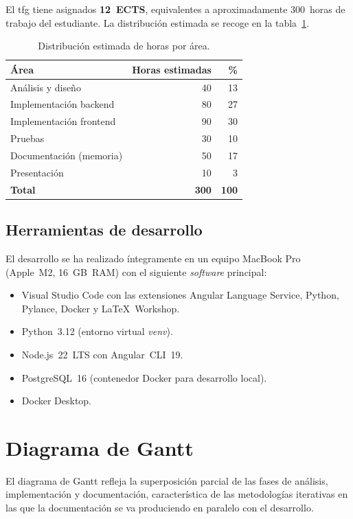El \gls{tfg} tiene asignados \textbf{12~ECTS}, equivalentes a aproximadamente 300~horas de
trabajo del estudiante. La distribución estimada se recoge en la
tabla~\ref{tab:horas}.

\begin{table}[H]
  \centering
  \caption{Distribución estimada de horas por área.}
  \label{tab:horas}
  \begin{tabular}{lrr}
    \toprule
    \textbf{Área} & \textbf{Horas estimadas} & \textbf{\%} \\
    \midrule
    Análisis y diseño & 40 & 13 \\
    Implementación backend & 80 & 27 \\
    Implementación frontend & 90 & 30 \\
    Pruebas & 30 & 10 \\
    Documentación (memoria) & 50 & 17 \\
    Presentación & 10 & 3 \\
    \midrule
    \textbf{Total} & \textbf{300} & \textbf{100} \\
    \bottomrule
  \end{tabular}
\end{table}

\subsection{Herramientas de desarrollo}
\label{subsec:herramientas-dev}

El desarrollo se ha realizado íntegramente en un equipo MacBook Pro (Apple~M2,
16~GB~RAM) con el siguiente \textit{software} principal:

\begin{itemize}
  \item Visual Studio Code con las extensiones Angular Language Service, Python,
    Pylance, Docker y LaTeX~Workshop.
  \item Python~3.12 (entorno virtual \textit{venv}).
  \item Node.js~22~LTS con Angular~CLI~19.
  \item PostgreSQL~16 (contenedor Docker para desarrollo local).
  \item Docker Desktop.
\end{itemize}

\section{Diagrama de Gantt}
\label{sec:gantt}



El diagrama de Gantt refleja la superposición parcial de las fases de análisis,
implementación y documentación, característica de las metodologías iterativas en las que
la documentación se va produciendo en paralelo con el desarrollo.
